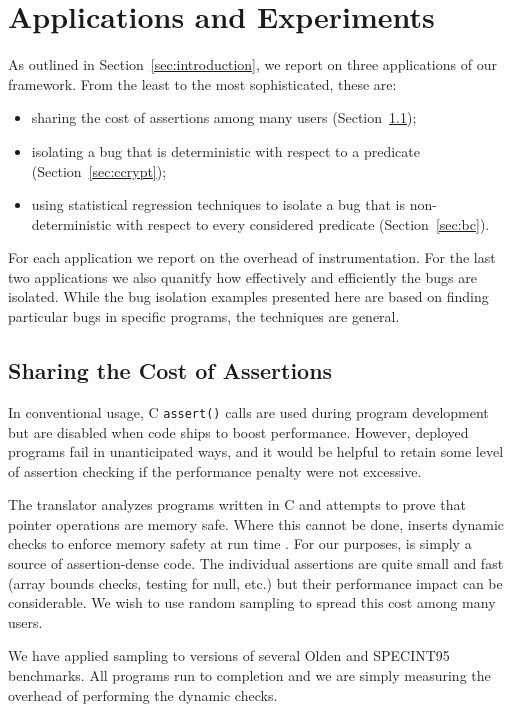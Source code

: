 \section{Applications and Experiments}
\label{sec:applications}

As outlined in Section~\ref{sec:introduction}, we report on three
applications of our framework.  From the least to the most sophisticated,
these are:
\begin{itemize}
\item sharing the cost of assertions among many users (Section~\ref{sec:ccured});

\item isolating a bug that is deterministic with respect to a predicate
(Section~\ref{sec:ccrypt});

\item using statistical regression techniques to isolate a bug that is non-deterministic with respect to every considered predicate (Section~\ref{sec:bc}).
\end{itemize}
For each application we report on the overhead of instrumentation.
For the last two applications we also quanitfy how effectively and efficiently
the bugs are isolated.  While the bug isolation examples presented here
are based on finding particular bugs in specific programs, 
the techniques are general.


\subsection{Sharing the Cost of Assertions}
\label{sec:ccured}

In conventional usage, C \texttt{assert()} calls are used during
program development but are disabled when code 
ships to boost performance.  However, deployed programs fail in
unanticipated ways, and it would be helpful to retain some level of
assertion checking if the performance penalty were not excessive.

The \CCured translator analyzes programs written in C and
attempts to prove that pointer operations are memory
safe.  Where this cannot be done, \CCured inserts dynamic checks to
enforce memory safety at run time \cite{POPL_'02*128}.  For our purposes, 
\CCured is simply a source of assertion-dense code.
The individual assertions are quite small and fast (array bounds
checks, testing for null, etc.)  but their performance impact can be
considerable.  We wish to use random sampling to spread this cost
among many users.

We have applied sampling to \CCured versions of several Olden
\cite{Carlisle:1996:OPPWDDSDMM} and SPECINT95 \cite{SPEC95} benchmarks.
All programs run to completion and we are simply measuring
the overhead of performing the dynamic checks.

